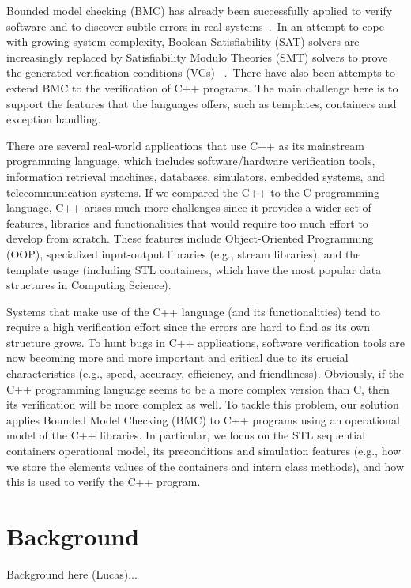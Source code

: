 \documentclass[a4paper]{llncs}
\begin{document}
Bounded model checking (BMC) has already been successfully applied to
verify software and to discover subtle errors in real
systems~\cite{handbook09}.\ In an attempt to cope with growing 
system complexity, Boolean Satisfiability (SAT) solvers are increasingly 
replaced by Satisfiability Modulo Theories (SMT) solvers to prove the generated 
verification conditions (VCs) ~\cite{Armando09,Ganai06,Cordeiro12}.\
There have also been attempts to extend BMC to the verification of C++ programs.
The main challenge here is to support the features that the languages offers, 
such as templates, containers and exception handling.

There are several real-world applications that use C++ as its mainstream programming 
language, which includes software/hardware verification tools, information retrieval 
machines, databases, simulators, embedded systems, and telecommunication systems. 
If we compared the C++ to the C programming language, C++ arises much more challenges 
since it provides a wider set of features, libraries and functionalities that would require 
too much effort to develop from scratch. These features include Object-Oriented Programming (OOP), 
specialized input-output libraries (e.g., stream libraries), and the template usage 
(including STL containers, which have the most popular data structures in Computing Science).

Systems that make use of the C++ language (and its functionalities) tend to require a high 
verification effort since the errors are hard to find as its own structure grows. 
To hunt bugs in C++ applications, software verification tools are now becoming more and more important 
and critical due to its crucial characteristics (e.g., speed, accuracy, efficiency, and friendliness). 
Obviously, if the C++ programming language seems to be a more complex version than C, then its verification 
will be more complex as well. To tackle this problem, our solution applies Bounded Model Checking (BMC) 
to C++ programs using an operational model of the C++ libraries. In particular, we focus on the STL 
sequential containers operational model, its preconditions and simulation features 
(e.g., how we store the elements values of the containers and intern class methods), 
and how this is used to verify the C++ program.

\section{Background}
%
Background here (Lucas)...
\end{document}
